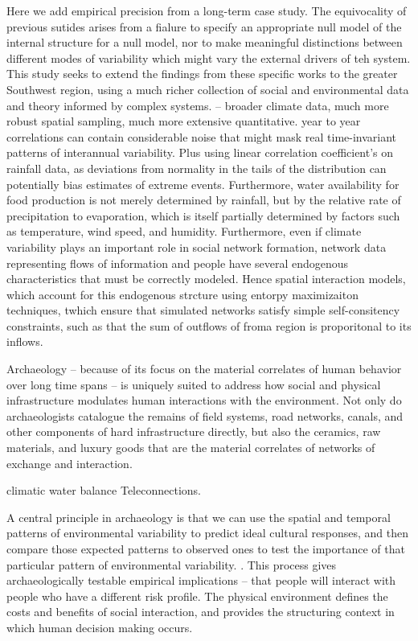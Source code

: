 \documentclass[fleqn,10pt]{wlscirep}
\begin{document}
Here we add empirical precision from a long-term case study. The equivocality of previous sutides arises from a fialure to specify an appropriate null model of the internal structure for a null model, nor to make meaningful distinctions between different modes of variability which might vary the external drivers of teh system. This study seeks to extend the findings from these specific works to the greater Southwest region, using a much richer collection of social and environmental data and theory informed by complex systems. -- broader climate data, much more robust spatial sampling, much more extensive quantitative. year to year correlations can contain considerable noise that might mask real time-invariant patterns of interannual variability. Plus using linear correlation coefficient's on rainfall data, as deviations from normality in the tails of the distribution can potentially bias estimates of extreme events. Furthermore, water availability for food production is not merely determined by rainfall, but by the relative rate of precipitation to evaporation, which is itself partially determined by factors such as temperature, wind speed, and humidity. Furthermore, even if climate variability plays an important role in social network formation, network data representing flows of information and people have several endogenous characteristics that must be correctly modeled. Hence spatial interaction models, which account for this endogenous strcture using entorpy maximizaiton techniques, twhich ensure that simulated networks satisfy simple self-consitency constraints, such as that the sum of outflows of froma region is proporitonal to its inflows.


Archaeology -- because of its focus on the material correlates of human behavior over long time spans -- is uniquely suited to address how social and physical infrastructure modulates human interactions with the environment. Not only do archaeologists catalogue the remains of field systems, road networks, canals, and other components of hard infrastructure directly, but also the ceramics, raw materials, and luxury goods that are the material correlates of networks of exchange and interaction. 

climatic water balance
Teleconnections.

A central principle in archaeology is that we can use the spatial and temporal patterns of environmental variability to predict ideal cultural responses, and then compare those expected patterns to observed ones to test the importance of that particular pattern of environmental variability. \cite{halstead1989}. This process gives archaeologically testable empirical implications -- that people will interact with people who have a different risk profile. The physical environment defines the costs and benefits of social interaction, and provides the structuring context in which human decision making occurs.
\end{document}
